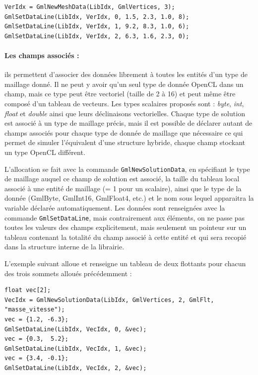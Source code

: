 \documentclass[a4paper,12pt]{article}
\begin{document}
\begin{tt}
\begin{verbatim}
VerIdx = GmlNewMeshData(LibIdx, GmlVertices, 3);
GmlSetDataLine(LibIdx, VerIdx, 0, 1.5, 2.3, 1.0, 8);
GmlSetDataLine(LibIdx, VerIdx, 1, 9.2, 8.3, 1.0, 6);
GmlSetDataLine(LibIdx, VerIdx, 2, 6.3, 1.6, 2.3, 0);
\end{verbatim}
\end{tt}
\normalfont

\paragraph{Les champs associés : } ils permettent d'associer des données librement à toutes les entités d'un type de maillage donné.
Il ne peut y avoir qu'un seul type de donnée OpenCL dans un champ, mais ce type peut être vectoriel (taille de 2 à 16) et peut même être composé d'un tableau de vecteurs.
Les types scalaires proposés sont : \emph{byte}, \emph{int}, \emph{float} et \emph{double} ainsi que leurs déclinaisons vectorielles.
Chaque type de solution est associé à un type de maillage précis, mais il est possible de déclarer autant de champs associés pour chaque type de donnée de maillage que nécessaire ce qui permet de simuler l’équivalent d'une structure hybride, chaque champ stockant un type OpenCL différent.

L'allocation se fait avec la commande {\tt GmlNewSolutionData}, en spécifiant le type de maillage auquel ce champ de solution est associé, la taille du tableau local associé à une entité de maillage (= 1 pour un scalaire), ainsi que le type de la donnée (GmlByte, GmlInt16, GmlFloat4, etc.) et le nom sous lequel apparaitra la variable déclarée automatiquement.
Les données sont renseignées avec la commande {\tt GmlSetDataLine}, mais contrairement aux éléments, on ne passe pas toutes les valeurs des champs explicitement, mais seulement un pointeur sur un tableau contenant la totalité du champ associé à cette entité et qui sera recopié dans la structure interne de la librairie.

L'exemple suivant alloue et renseigne un tableau de deux flottants pour chacun des trois sommets alloués précédemment :

\begin{tt}
\begin{verbatim}
float vec[2];
VecIdx = GmlNewSolutionData(LibIdx, GmlVertices, 2, GmlFlt, "masse_vitesse");
vec = {1.2, -6.3};
GmlSetDataLine(LibIdx, VecIdx, 0, &vec);
vec = {0.3,  5.2};
GmlSetDataLine(LibIdx, VecIdx, 1, &vec);
vec = {3.4, -0.1};
GmlSetDataLine(LibIdx, VecIdx, 2, &vec);
\end{verbatim}
\end{tt}
\normalfont
\end{document}
